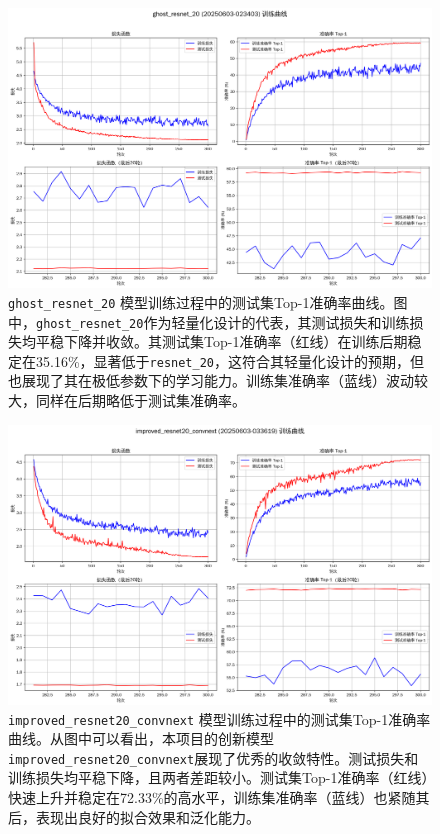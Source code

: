 \documentclass[a4paper]{article}
\begin{document}
\begin{figure}[H]
    \centering
    \includegraphics[width=\textwidth]{fig/training_curves_ghost_resnet_20.png}
    \caption{\texttt{ghost\_resnet\_20} 模型训练过程中的测试集Top-1准确率曲线。图中，\texttt{ghost\_resnet\_20}作为轻量化设计的代表，其测试损失和训练损失均平稳下降并收敛。其测试集Top-1准确率（红线）在训练后期稳定在35.16\%，显著低于\texttt{resnet\_20}，这符合其轻量化设计的预期，但也展现了其在极低参数下的学习能力。训练集准确率（蓝线）波动较大，同样在后期略低于测试集准确率。}
    \label{fig:train_curve_ghostresnet20}
\end{figure}

\begin{figure}[H]
    \centering
    \includegraphics[width=\textwidth]{fig/training_curves_improved_resnet20_convnext.png}
    \caption{\texttt{improved\_resnet20\_convnext} 模型训练过程中的测试集Top-1准确率曲线。从图中可以看出，本项目的创新模型\texttt{improved\_resnet20\_convnext}展现了优秀的收敛特性。测试损失和训练损失均平稳下降，且两者差距较小。测试集Top-1准确率（红线）快速上升并稳定在72.33\%的高水平，训练集准确率（蓝线）也紧随其后，表现出良好的拟合效果和泛化能力。}
    \label{fig:train_curve_improved}
\end{figure}
\end{document}
